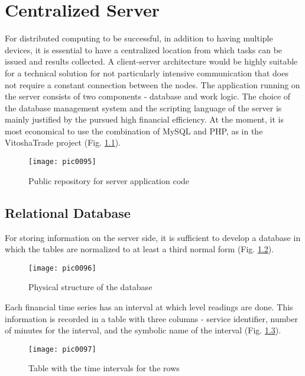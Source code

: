 \newpage
\chapter{Centralized Server}
\label{chapter05}

For distributed computing to be successful, in addition to having multiple devices, it is essential to have a centralized location from which tasks can be issued and results collected. A client-server architecture would be highly suitable for a technical solution for not particularly intensive communication that does not require a constant connection between the nodes. The application running on the server consists of two components - database and work logic. The choice of the database management system and the scripting language of the server is mainly justified by the pursued high financial efficiency. At the moment, it is most economical to use the combination of MySQL and PHP, as in the VitoshaTrade\cite{vtrade} project (Fig. \ref{fig:pic0095}).

\begin{figure}[h]
\centering
\texttt{[image: pic0095]}
\caption{Public repository for server application code}
\label{fig:pic0095}
\end{figure}
\FloatBarrier

\section{Relational Database}

For storing information on the server side, it is sufficient to develop a database in which the tables are normalized to at least a third normal form (Fig. \ref{fig:pic0096}).

\begin{figure}[h]
\centering
\texttt{[image: pic0096]}
\caption{Physical structure of the database}
\label{fig:pic0096}
\end{figure}
\FloatBarrier

Each financial time series has an interval at which level readings are done. This information is recorded in a table with three columns - service identifier, number of minutes for the interval, and the symbolic name of the interval (Fig. \ref{fig:pic0097}).

\begin{figure}[h]
\centering
\texttt{[image: pic0097]}
\caption{Table with the time intervals for the rows}
\label{fig:pic0097}
\end{figure}
\FloatBarrier

